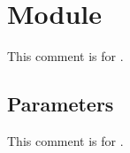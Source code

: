 \section{Module }\label{module-Ocamlary-module-FunctorTypeOf}%
This comment is for .

\subsection{Parameters\label{parameters+u+2}}%
\label{module-Ocamlary-module-FunctorTypeOf-argument-1-Collection}\begin{ocamlindent}This comment is for .


\end{ocamlindent}
